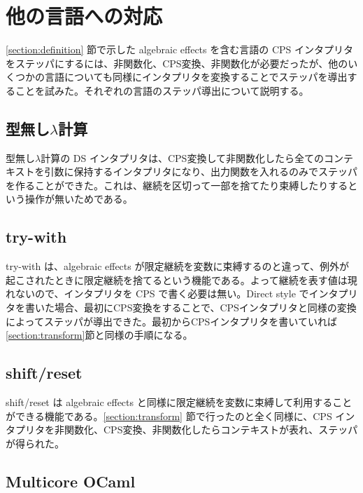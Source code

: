 \section{他の言語への対応}
\label{section:languages}

\ref{section:definition} 節で示した algebraic effects を含む言語の CPS インタプリタをステッパにするには、非関数化、CPS変換、非関数化が必要だったが、他のいくつかの言語についても同様にインタプリタを変換することでステッパを導出することを試みた。それぞれの言語のステッパ導出について説明する。


\subsection{型無し$\lambda$計算}
\label{subsection:lambda}

型無し$\lambda$計算の DS インタプリタは、CPS変換して非関数化したら全てのコンテキストを引数に保持するインタプリタになり、出力関数を入れるのみでステッパを作ることができた。これは、継続を区切って一部を捨てたり束縛したりするという操作が無いためである。


\subsection{try-with}
\label{subsection:try_with}

try-with は、algebraic effects が限定継続を変数に束縛するのと違って、例外が起こされたときに限定継続を捨てるという機能である。よって継続を表す値は現れないので、インタプリタを CPS で書く必要は無い。Direct style でインタプリタを書いた場合、最初にCPS変換をすることで、CPSインタプリタと同様の変換によってステッパが導出できた。最初からCPSインタプリタを書いていれば \ref{section:transform}節と同様の手順になる。


\subsection{shift/reset}
\label{subsection:shift/reset}

shift/reset は algebraic effects と同様に限定継続を変数に束縛して利用することができる機能である。\ref{section:transform} 節で行ったのと全く同様に、CPS インタプリタを非関数化、CPS変換、非関数化したらコンテキストが表れ、ステッパが得られた。


\subsection{Multicore OCaml}
\label{subsection:multicore_ocaml}

